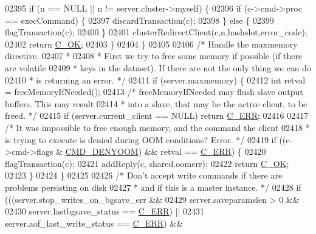 \begin{DoxyCode}
{{{{{{{{{{{{{{{{{{{{{{{{{{{{{{{02395         \textcolor{keywordflow}{if} (n == NULL || n != server.cluster->myself) \{
02396             \textcolor{keywordflow}{if} (c->cmd->proc == execCommand) \{
02397                 discardTransaction(c);
02398             \} \textcolor{keywordflow}{else} \{
02399                 flagTransaction(c);
02400             \}
02401             clusterRedirectClient(c,n,hashslot,error\_code);
02402             \textcolor{keywordflow}{return} \hyperlink{server_8h_a303769ef1065076e68731584e758d3e1}{C\_OK};
02403         \}
02404     \}
02405 
02406     \textcolor{comment}{/* Handle the maxmemory directive.}
02407 \textcolor{comment}{     *}
02408 \textcolor{comment}{     * First we try to free some memory if possible (if there are volatile}
02409 \textcolor{comment}{     * keys in the dataset). If there are not the only thing we can do}
02410 \textcolor{comment}{     * is returning an error. */}
02411     \textcolor{keywordflow}{if} (server.maxmemory) \{
02412         \textcolor{keywordtype}{int} retval = freeMemoryIfNeeded();
02413         \textcolor{comment}{/* freeMemoryIfNeeded may flush slave output buffers. This may result}
02414 \textcolor{comment}{         * into a slave, that may be the active client, to be freed. */}
02415         \textcolor{keywordflow}{if} (server.current\_client == NULL) \textcolor{keywordflow}{return} \hyperlink{server_8h_af98ac28d5f4d23d7ed5985188e6fb7d1}{C\_ERR};
02416 
02417         \textcolor{comment}{/* It was impossible to free enough memory, and the command the client}
02418 \textcolor{comment}{         * is trying to execute is denied during OOM conditions? Error. */}
02419         \textcolor{keywordflow}{if} ((c->cmd->flags & \hyperlink{server_8h_aef97c640ad8dfdaca21eb67d4c37e447}{CMD\_DENYOOM}) && retval == \hyperlink{server_8h_af98ac28d5f4d23d7ed5985188e6fb7d1}{C\_ERR}) \{
02420             flagTransaction(c);
02421             addReply(c, shared.oomerr);
02422             \textcolor{keywordflow}{return} \hyperlink{server_8h_a303769ef1065076e68731584e758d3e1}{C\_OK};
02423         \}
02424     \}
02425 
02426     \textcolor{comment}{/* Don't accept write commands if there are problems persisting on disk}
02427 \textcolor{comment}{     * and if this is a master instance. */}
02428     \textcolor{keywordflow}{if} (((server.stop\_writes\_on\_bgsave\_err &&
02429           server.saveparamslen > 0 &&
02430           server.lastbgsave\_status == \hyperlink{server_8h_af98ac28d5f4d23d7ed5985188e6fb7d1}{C\_ERR}) ||
02431           server.aof\_last\_write\_status == \hyperlink{server_8h_af98ac28d5f4d23d7ed5985188e6fb7d1}{C\_ERR}) &&
}}}}}}}}}}}}}}}}}}}}}}}}}}}}}}}
\end{DoxyCode}
